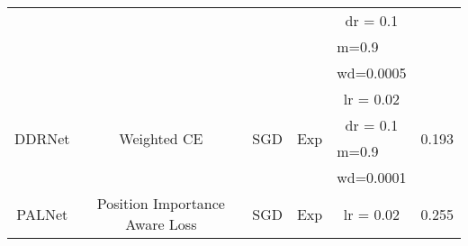 \documentclass{article}
\begin{document}
\begin{table}[tbh]
\begin{adjustbox}{max width=\textwidth}
\begin{tabular}{cccccl}
\multicolumn{1}{|c|}{}                        & \multicolumn{1}{c|}{}                             & \multicolumn{1}{c|}{}                     & \multicolumn{1}{c|}{}                      & \multicolumn{1}{c|}{dr = 0.1}   & \multicolumn{1}{l|}{}                       \\ \cline{5-5}
\multicolumn{1}{|c|}{}                        & \multicolumn{1}{c|}{}                             & \multicolumn{1}{c|}{}                     & \multicolumn{1}{c|}{}                      & \multicolumn{1}{l|}{m=0.9}      & \multicolumn{1}{l|}{}                       \\ \cline{5-5}
\multicolumn{1}{|c|}{}                        & \multicolumn{1}{c|}{}                             & \multicolumn{1}{c|}{}                     & \multicolumn{1}{c|}{}                      & \multicolumn{1}{l|}{wd=0.0005}  & \multicolumn{1}{l|}{}                       \\ \hline
\multicolumn{1}{|c|}{\multirow{4}{*}{DDRNet \cite{li2019rgbd}}} & \multicolumn{1}{c|}{\multirow{4}{*}{Weighted CE}} & \multicolumn{1}{c|}{\multirow{4}{*}{SGD}} & \multicolumn{1}{c|}{\multirow{4}{*}{Exp}}  & \multicolumn{1}{c|}{lr = 0.02}  & \multicolumn{1}{l|}{\multirow{4}{*}{0.193}} \\ \cline{5-5}
\multicolumn{1}{|c|}{}                        & \multicolumn{1}{c|}{}                             & \multicolumn{1}{c|}{}                     & \multicolumn{1}{c|}{}                      & \multicolumn{1}{c|}{dr = 0.1}   & \multicolumn{1}{l|}{}                       \\ \cline{5-5}
\multicolumn{1}{|c|}{}                        & \multicolumn{1}{c|}{}                             & \multicolumn{1}{c|}{}                     & \multicolumn{1}{c|}{}                      & \multicolumn{1}{l|}{m=0.9}      & \multicolumn{1}{l|}{}                       \\ \cline{5-5}
\multicolumn{1}{|c|}{}                        & \multicolumn{1}{c|}{}                             & \multicolumn{1}{c|}{}                     & \multicolumn{1}{c|}{}                      & \multicolumn{1}{l|}{wd=0.0001}  & \multicolumn{1}{l|}{}                       \\ \hline
\multicolumn{1}{|c|}{\multirow{4}{*}{PALNet \cite{li2019depth}}} & \multicolumn{1}{c|}{\multirow{4}{*}{Position Importance Aware Loss}} & \multicolumn{1}{c|}{\multirow{4}{*}{SGD}} & \multicolumn{1}{c|}{\multirow{4}{*}{Exp}}  & \multicolumn{1}{c|}{lr = 0.02}  & \multicolumn{1}{l|}{\multirow{4}{*}{0.255}} \\ \cline{5-5}

\end{tabular}
\end{adjustbox}
\end{table}
\end{document}

